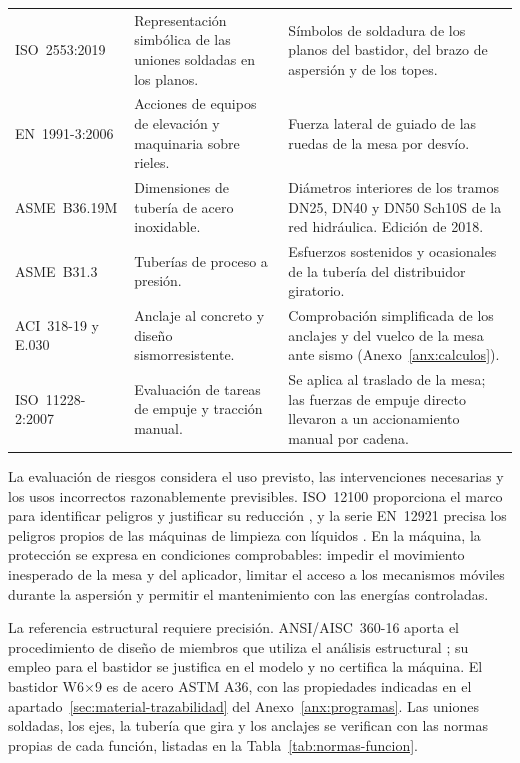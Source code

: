 \begin{longtable}{@{}>{\raggedright\arraybackslash}p{}>{\raggedright\arraybackslash}p{}>{\raggedright\arraybackslash}p{}@{}}
\addlinespace[4pt]
ISO~2553:2019 \cite{iso2553} & Representación simbólica de las uniones soldadas en los planos. & Símbolos de soldadura de los planos del bastidor, del brazo de aspersión y de los topes. \\
\addlinespace[4pt]
EN~1991-3:2006 \cite{en19913} & Acciones de equipos de elevación y maquinaria sobre rieles. & Fuerza lateral de guiado de las ruedas de la mesa por desvío. \\
\addlinespace[4pt]
ASME~B36.19M \cite{asmeb3619} & Dimensiones de tubería de acero inoxidable. & Diámetros interiores de los tramos DN25, DN40 y DN50 Sch10S de la red hidráulica. Edición de 2018. \\
\addlinespace[4pt]
ASME~B31.3 \cite{asmeb313} & Tuberías de proceso a presión. & Esfuerzos sostenidos y ocasionales de la tubería del distribuidor giratorio. \\
\addlinespace[4pt]
ACI~318-19 \cite{aci318} y E.030 \cite{e030} & Anclaje al concreto y diseño sismorresistente. & Comprobación simplificada de los anclajes y del vuelco de la mesa ante sismo (Anexo~\ref{anx:calculos}). \\
\addlinespace[4pt]
ISO~11228-2:2007 \cite{iso11228} & Evaluación de tareas de empuje y tracción manual. & Se aplica al traslado de la mesa; las fuerzas de empuje directo llevaron a un accionamiento manual por cadena. \\
\end{longtable}
\endgroup

La evaluación de riesgos considera el uso previsto, las intervenciones necesarias y los usos incorrectos razonablemente previsibles. ISO~12100 proporciona el marco para identificar peligros y justificar su reducción \cite{iso12100}, y la serie EN~12921 precisa los peligros propios de las máquinas de limpieza con líquidos \cite{en12921_1}. En la máquina, la protección se expresa en condiciones comprobables: impedir el movimiento inesperado de la mesa y del aplicador, limitar el acceso a los mecanismos móviles durante la aspersión y permitir el mantenimiento con las energías controladas.

La referencia estructural requiere precisión. ANSI/AISC~360-16 aporta el procedimiento de diseño de miembros que utiliza el análisis estructural \cite{aisc360}; su empleo para el bastidor se justifica en el modelo y no certifica la máquina. El bastidor W6$\times$9 es de acero ASTM A36, con las propiedades indicadas en el apartado~\ref{sec:material-trazabilidad} del Anexo~\ref{anx:programas}. Las uniones soldadas, los ejes, la tubería que gira y los anclajes se verifican con las normas propias de cada función, listadas en la Tabla~\ref{tab:normas-funcion}.

